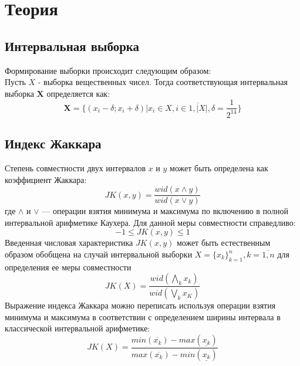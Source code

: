 \documentclass[12pt,a4paper]{article}
\begin{document}
	\section{Теория}
            \subsection{Интервальная выборка}
                Формирование выборки происходит следующим образом:\\
                Пусть $X$ - выборка вещественных чисел. Тогда соответствующая интервальная выборка $\mathbf{X}$ определяется как:
                \begin{equation}
                    \mathbf{X} = \{(x_i - \delta; x_i + \delta)|x_i \in X, i \in \overline{1, |X|}, \delta = \frac{1}{2^{14}}\}
                \end{equation}
            \subsection{Индекс Жаккара}
                Степень совместности двух интервалов $x$ и $y$ может быть определена как коэффициент Жаккара:
                \begin{equation}
                    JK(x, y) = \frac{wid(x \wedge y)}{wid(x \vee y)}
                \end{equation}
                где $\wedge$ и $\vee$ — операции взятия минимума и максимума по включению в полной интервальной арифметике Каухера. Для данной меры совместности справедливо:
                \begin{equation}
                    -1 \leq JK(x, y) \leq 1
                \end{equation}
                Введенная числовая характеристика $JK(x, y)$ может быть естественным образом обобщена на случай интервальной выборки $X = \{x_k\}^n_{k=1}, k = \overline{1,n}$ для определения
                ее меры совместности
                \begin{equation}
                    JK(X) = \frac{wid(\bigwedge_k x_k)}{wid(\bigvee_k x_K)}
                \end{equation}
                Выражение индекса Жаккара можно переписать используя операции взятия минимума
                и максимума в соответствии с определением ширины интервала в классической
                интервальной арифметике:
                \begin{equation}
                    JK(X) = \frac{min(\overline{x_k}) - max(\underline{x_k})}{max(\overline{x_k}) - min(\underline{x_k})}
                \end{equation}
\end{document}
